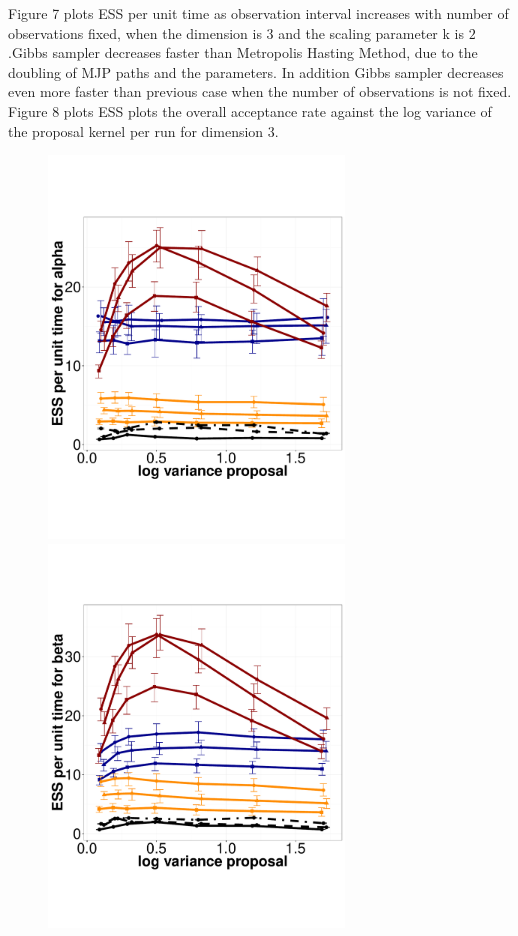 Figure 7 plots ESS per unit time as observation interval increases with number of observations fixed, when the dimension is $3$ and the scaling parameter k is $2$.Gibbs sampler decreases faster than Metropolis Hasting Method, due to the doubling of MJP paths and the parameters. In addition Gibbs sampler decreases even more faster than previous case when the number of observations is not fixed. \\

Figure 8 plots ESS plots the overall  acceptance rate against the log variance of the proposal kernel per run for dimension $3$. 


  \begin{figure}%
  \centering
  \begin{minipage}[!hp]{0.45\linewidth}
  \centering
    \includegraphics [width=0.70\textwidth, angle=0]{figs/exp_3_alpha.pdf}
      \end{minipage}
  \begin{minipage}[hp]{0.45\linewidth}
  \centering
    \includegraphics [width=0.70\textwidth, angle=0]{figs/exp_3_beta.pdf}

\end{minipage}
\end{figure}
